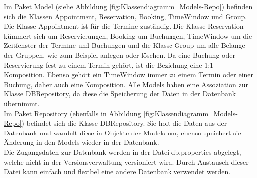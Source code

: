 Im Paket Model (siehe Abbildung \ref{fig:Klassendiagramm_Models-Repo}) befinden sich die Klassen Appointment, Reservation, Booking, TimeWindow und Group. Die Klasse Appointment ist für die Termine zuständig. Die Klasse Reservation kümmert sich um Reservierungen, Booking um Buchungen, TimeWindow um die Zeitfenster der Termine und Buchungen und die Klasse Group um alle Belange der Gruppen, wie zum Beispiel anlegen oder löschen.
Da eine Buchung oder Reservierung fest zu einem Termin gehört, ist die Beziehung eine 1:1-Komposition. Ebenso gehört ein TimeWindow immer zu einem Termin oder einer Buchung, daher auch eine Komposition.
Alle Models haben eine Assoziation zur Klasse DBRepository, da diese die Speicherung der Daten in der Datenbank übernimmt.
\\

Im Paket Repository (ebenfalls in Abbildung \ref{fig:Klassendiagramm_Models-Repo}) befindet sich die Klasse DBRepository. Sie holt die Daten aus der Datenbank und wandelt diese in Objekte der Models um, ebenso speichert sie Änderung in den Models wieder in der Datenbank. \\
Die Zugangsdaten zur Datenbank werden in der Datei db.properties abgelegt, welche nicht in der Versionsverwaltung versioniert wird. Durch Austausch dieser Datei kann einfach und flexibel eine andere Datenbank verwendet werden.
